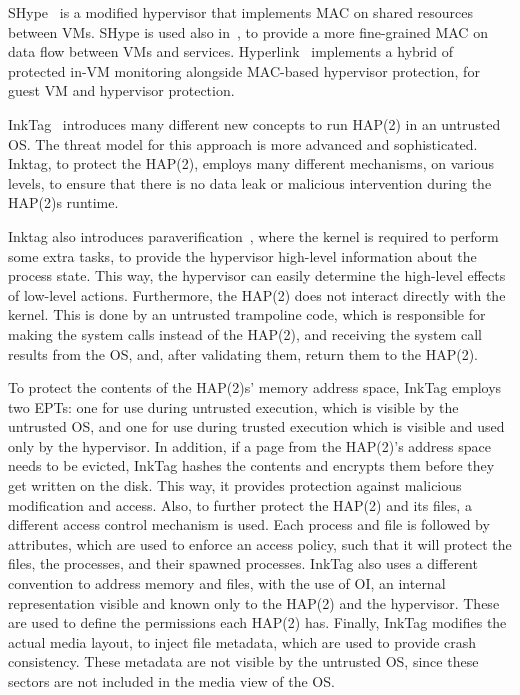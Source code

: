 \par SHype~\cite{sailer2005building} is a modified hypervisor that implements \ac{MAC} on shared resources between \ac{VM}s. SHype is used also in~\cite{hay2008forensics}, to provide a more fine-grained \ac{MAC} on data flow between \ac{VM}s and services. Hyperlink~\cite{xiao2016hyperlink} implements a hybrid of protected in-\ac{VM} monitoring alongside \ac{MAC}-based hypervisor protection, for guest \ac{VM} and hypervisor protection.

\par InkTag~\cite{hofmann2013inktag} introduces many different new concepts to run \ac{HAP(2)} in an untrusted \ac{OS}. The threat model for this approach is more advanced and sophisticated. Inktag, to protect the \ac{HAP(2)}, employs many different mechanisms, on various levels, to ensure that there is no data leak or malicious intervention during the \ac{HAP(2)}s runtime. 

\par Inktag also introduces paraverification~\cite{hofmann2013inktag}, where the kernel is required to perform some extra tasks, to provide the hypervisor high-level information about the process state. This way, the hypervisor can easily determine the high-level effects of low-level actions. Furthermore, the \ac{HAP(2)} does not interact directly with the kernel. This is done by an untrusted trampoline code, which is responsible for making the system calls instead of the \ac{HAP(2)}, and receiving the system call results from the \ac{OS}, and, after validating them, return them to the \ac{HAP(2)}.

\par To protect the contents of the \ac{HAP(2)}s' memory address space, InkTag employs two \acp{EPT}: one for use during untrusted execution, which is visible by the untrusted \ac{OS}, and one for use during trusted execution which is visible and used only by the hypervisor. In addition, if a page from the \ac{HAP(2)}'s address space needs to be evicted, InkTag hashes the contents and encrypts them before they get written on the disk. This way, it provides protection against malicious modification and access.
Also, to further protect the \ac{HAP(2)} and its files, a different access control mechanism is used. Each process and file is followed by attributes, which are used to enforce an access policy, such that it will protect the files, the processes, and their spawned processes. InkTag also uses a different convention to address memory and files, with the use of \ac{OI}, an internal representation visible and known only to the \ac{HAP(2)} and the hypervisor. These are used to define the permissions each \ac{HAP(2)} has.
Finally, InkTag modifies the actual media layout, to inject file metadata, which are used to provide crash consistency. These metadata are not visible by the untrusted \ac{OS}, since these sectors are not included in the media view of the \ac{OS}. 

